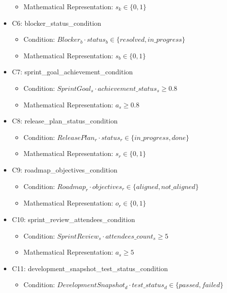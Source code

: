 \documentclass{article}
\begin{document}
\begin{itemize}
\begin{itemize}
            \item Mathematical Representation: $s_{k} \in \{0, 1\}$
        \end{itemize}
    \item C6: blocker\_status\_condition
        \begin{itemize}
            \item Condition: $Blocker_{b} \cdot status_{b} \in \{resolved, in\_progress\}$
            \item Mathematical Representation: $s_{b} \in \{0, 1\}$
        \end{itemize}
    \item C7: sprint\_goal\_achievement\_condition
        \begin{itemize}
            \item Condition: $SprintGoal_{s} \cdot achievement\_status_{s} \geq 0.8$
            \item Mathematical Representation: $a_{s} \geq 0.8$
        \end{itemize}
    \item C8: release\_plan\_status\_condition
        \begin{itemize}
            \item Condition: $ReleasePlan_{r} \cdot status_{r} \in \{in\_progress, done\}$
            \item Mathematical Representation: $s_{r} \in \{0, 1\}$
        \end{itemize}
    \item C9: roadmap\_objectives\_condition
        \begin{itemize}
            \item Condition: $Roadmap_{r} \cdot objectives_{r} \in \{aligned, not\_aligned\}$
            \item Mathematical Representation: $o_{r} \in \{0, 1\}$
        \end{itemize}
    \item C10: sprint\_review\_attendees\_condition
        \begin{itemize}
            \item Condition: $SprintReview_{s} \cdot attendees\_count_{s} \geq 5$
            \item Mathematical Representation: $a_{s} \geq 5$
        \end{itemize}
    \item C11: development\_snapshot\_test\_status\_condition
        \begin{itemize}
            \item Condition: $DevelopmentSnapshot_{d} \cdot test\_status_{d} \in \{passed, failed\}$

\end{itemize}
\end{itemize}
\end{document}
